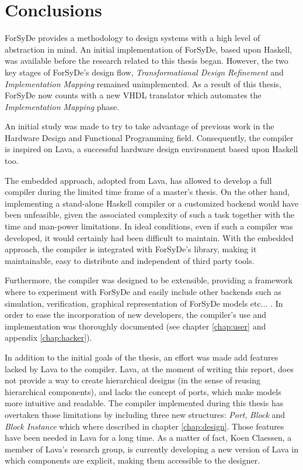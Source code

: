 \section{Conclusions}
ForSyDe provides a methodology to design systems with a high level of
abstraction in mind. An initial implementation of ForSyDe, based upon
Haskell, was available before the research related to this thesis began.
However, the two key stages of ForSyDe's design flow,
\textit{Transformational Design Refinement} and \textit{Implementation
  Mapping} remained unimplemented. As a result of this thesis, ForSyDe
now counts with a new VHDL translator which automates the
\textit{Implementation Mapping} phase.

An initial study was made to try to take advantage of previous work in
the Hardware Design and Functional Programming field. Consequently, the
compiler is inspired on Lava, a successful hardware design environment
based upon Haskell too.

The embedded approach, adopted from Lava, has allowed to develop a
full compiler during the limited time frame of a master's thesis.  On
the other hand, implementing a stand-alone Haskell compiler or a
customized backend would have been unfeasible, given the associated
complexity of such a task together with the time and man-power
limitations. In ideal conditions, even if such a compiler was
developed, it would certainly had been difficult to maintain.  With
the embedded approach, the compiler is integrated with ForSyDe's
library, making it maintainable, easy to distribute and independent of
third party tools.

Furthermore, the compiler was designed to be extensible, providing a
framework where to experiment with ForSyDe and easily include other backends
such as simulation, verification, graphical representation of ForSyDe
models etc$\dots$ . In order to ease the incorporation of new developers,
the compiler's use and implementation was thoroughly documented (see
chapter \ref{chap:user} and appendix \ref{chap:hacker}).

In addition to the initial goals of the thesis, an effort was made add
features lacked by Lava to the compiler. Lava, at the moment of
writing this report, does not provide a way to create hierarchical
designs (in the sense of reusing hierarchical components), and lacks
the concept of ports, which make models more intuitive and readable.
The compiler implemented during this thesis has overtaken those
limitations by including three new structures: \textit{Port},
\textit{Block} and \textit{Block Instance} which where described in
chapter \ref{chap:design}. Those features have been needed in Lava for
a long time. As a matter of fact, Koen Claessen, a member of Lava's
research group, is currently developing a new version of Lava in which
components are explicit, making them accessible to the designer.


